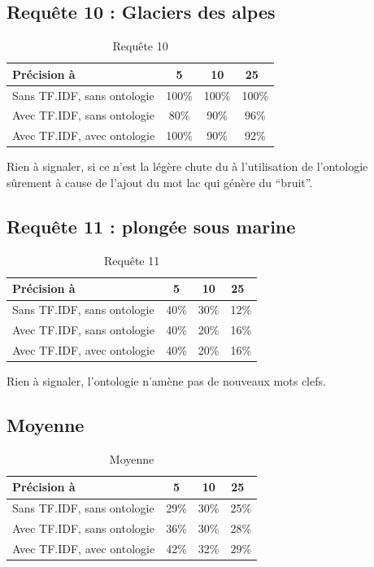 \documentclass{article}
\begin{document}
\subsection{Requête 10 : \og Glaciers des alpes \fg }

\begin{table}[H]
    \centering
    \caption{Requête 10}
\begin{tabular}{|l|c|c|c|}
    \hline
    Précision à & 5 & 10 & 25 \\
    \hline
    Sans TF.IDF, sans ontologie & 100\% & 100\% & 100\% \\
    \hline
    Avec TF.IDF, sans ontologie & 80\% & 90\% & 96\% \\
    \hline
    Avec TF.IDF, avec ontologie & 100\% & 90\% & 92\% \\
    \hline
\end{tabular}
\end{table}

Rien à signaler, si ce n’est la légère chute du à l’utilisation de l’ontologie
sûrement à cause de l’ajout du mot lac qui génère du “bruit”.

\subsection{Requête 11 : \og plongée sous marine \fg }

\begin{table}[H]
    \centering
    \caption{Requête 11}
\begin{tabular}{|l|c|c|c|}
    \hline
    Précision à & 5 & 10 & 25 \\
    \hline
    Sans TF.IDF, sans ontologie & 40\% & 30\% & 12\% \\
    \hline
    Avec TF.IDF, sans ontologie & 40\% & 20\% & 16\% \\
    \hline
    Avec TF.IDF, avec ontologie & 40\% & 20\% & 16\% \\
    \hline
\end{tabular}
\end{table}

Rien à signaler, l’ontologie n’amène pas de nouveaux mots clefs.

\subsection{Moyenne}

\begin{table}[H]
    \centering
    \caption{Moyenne}
\begin{tabular}{|l|c|c|c|}
    \hline
    Précision à & 5 & 10 & 25 \\
    \hline
    Sans TF.IDF, sans ontologie & 29\% &   30\% &  25\% \\
    \hline
    Avec TF.IDF, sans ontologie & 36\% &   30\% &  28\% \\
    \hline
    Avec TF.IDF, avec ontologie & 42\% &   32\% &  29\% \\
    \hline
\end{tabular}
\end{table}
\end{document}
